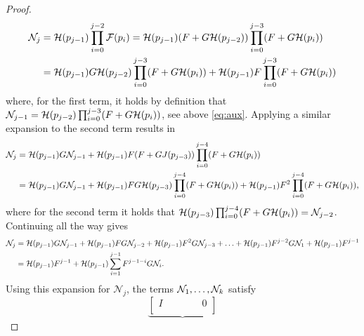 \begin{proof}
\begin{equation}
\begin{aligned}
            \mathcal{N}_j &= \mathcal{H}(p_{j-1}) \prod_{i=0}^{j-2} \mathcal{F}(p_i) = \mathcal{H}(p_{j-1}) (F + G \mathcal{H}(p_{j-2})) \prod_{i=0}^{j-3} (F + G\mathcal{H}(p_i)) \\
            &= \mathcal{H}(p_{j-1}) G \mathcal{H}(p_{j-2}) \prod_{i=0}^{j-3} (F + G\mathcal{H}(p_i)) + \mathcal{H}(p_{j-1}) F \prod_{i=0}^{j-3} (F + G\mathcal{H}(p_i))
            \label{eq:N_K_proof}
        \end{aligned}
    \end{equation}
    where, for the first term, it holds by definition that $\mathcal{N}_{j-1}=\mathcal{H}(p_{j-2}) \prod_{i=0}^{j-3} (F + G\mathcal{H}(p_i))$, see above \eqref{eq:aux}. Applying a similar expansion to the second term results in 
    \begin{equation}
        \begin{aligned}
            \mathcal{N}_j &= \mathcal{H}(p_{j-1}) G \mathcal{N}_{j-1} + \mathcal{H}(p_{j-1}) F (F+GJ(p_{j-3})) \prod_{i=0}^{j-4} (F+G\mathcal{H}(p_i)) \\
            &= \mathcal{H}(p_{j-1}) G \mathcal{N}_{j-1} + \mathcal{H}(p_{j-1}) F G \mathcal{H}(p_{j-3}) \prod_{i=0}^{j-4} (F+G\mathcal{H}(p_i)) + \mathcal{H}(p_{j-1}) F^2 \prod_{i=0}^{j-4} (F+G\mathcal{H}(p_i)),
        \end{aligned}
    \end{equation}
    where for the second term it holds that $\mathcal{H}(p_{j-3}) \prod_{i=0}^{j-4} (F+G\mathcal{H}(p_i)) = \mathcal{N}_{j-2}$. Continuing all the way gives
    \begin{align}
        \mathcal{N}_j &= \mathcal{H}(p_{j-1}) G \mathcal{N}_{j-1} + \mathcal{H}(p_{j-1}) F G \mathcal{N}_{j-2} + \mathcal{H}(p_{j-1}) F^2 G \mathcal{N}_{j-3} + \ldots + \mathcal{H}(p_{j-1}) F^{j-2} G \mathcal{N}_{1} + \mathcal{H}(p_{j-1}) F^{j-1} \nonumber \\
        &= \mathcal{H}(p_{j-1}) F^{j-1} + \mathcal{H}(p_{j-1}) \sum_{i=1}^{j-1} F^{j-1-i}G \mathcal{N}_i.
        \label{eq:N_k_proof2}
    \end{align}
    Using this expansion for $\mathcal{N}_j$, the terms $\mathcal{N}_1,\ldots,\mathcal{N}_k$ satisfy
    \begin{equation}
        \underbrace{
        \begin{bmatrix}
            I & & & & &  0 \\

\end{bmatrix}}
\end{equation}
\end{proof}
